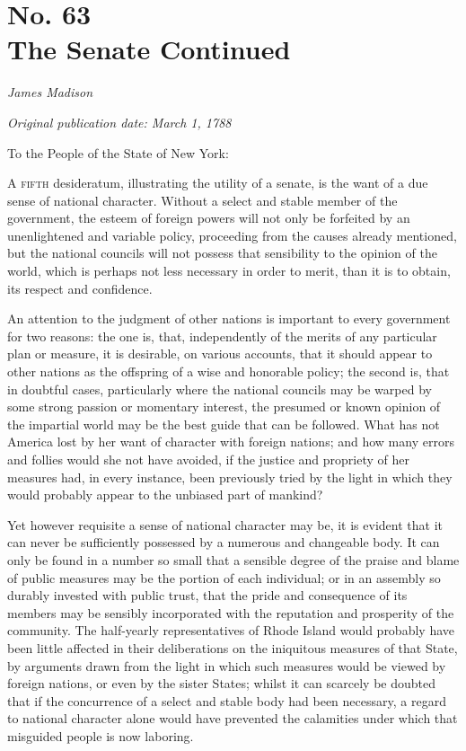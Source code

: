 \chapter[No. 63: The Senate Continued]{No. 63\\ {\small The Senate Continued}}

\textit{James Madison}

\textit{Original publication date: March 1, 1788}
\vspace{1cm}

To the People of the State of New York:
\vspace{.4cm}

\textsc{A fifth} desideratum, illustrating the utility of a senate, is the want of a due sense of national character. 
Without a select and stable member of the government, the esteem of foreign powers will not only be forfeited by an unenlightened and variable policy, proceeding from the causes already mentioned, but the national councils will not possess that sensibility to the opinion of the world, which is perhaps not less necessary in order to merit, than it is to obtain, its respect and confidence.

An attention to the judgment of other nations is important to every government for two reasons: the one is, that, independently of the merits of any particular plan or measure, it is desirable, on various accounts, that it should appear to other nations as the offspring of a wise and honorable policy; the second is, that in doubtful cases, particularly where the national councils may be warped by some strong passion or momentary interest, the presumed or known opinion of the impartial world may be the best guide that can be followed. 
What has not America lost by her want of character with foreign nations; and how many errors and follies would she not have avoided, if the justice and propriety of her measures had, in every instance, been previously tried by the light in which they would probably appear to the unbiased part of mankind?

Yet however requisite a sense of national character may be, it is evident that it can never be sufficiently possessed by a numerous and changeable body. 
It can only be found in a number so small that a sensible degree of the praise and blame of public measures may be the portion of each individual; or in an assembly so durably invested with public trust, that the pride and consequence of its members may be sensibly incorporated with the reputation and prosperity of the community. 
The half-yearly representatives of Rhode Island would probably have been little affected in their deliberations on the iniquitous measures of that State, by arguments drawn from the light in which such measures would be viewed by foreign nations, or even by the sister States; whilst it can scarcely be doubted that if the concurrence of a select and stable body had been necessary, a regard to national character alone would have prevented the calamities under which that misguided people is now laboring.

